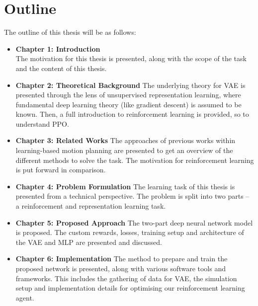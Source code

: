 \section{Outline}

The outline of this thesis will be as follows:
\vspace{2mm}
\begin{itemize}
    \item \textbf{Chapter 1: Introduction} \\
    The motivation for this thesis is presented, along with the scope of the task and the content of this thesis. \vspace{3mm}

    \item \textbf{Chapter 2: Theoretical Background}
    The underlying theory for VAE is presented through the lens of unsupervised representation learning, where fundamental deep learning theory (like gradient descent) is assumed to be known. Then, a full introduction to reinforcement learning is provided, so to understand PPO.
    \vspace{3mm}
    
    \item \textbf{Chapter 3: Related Works} 
    The approaches of previous works within learning-based motion planning are presented to get an overview of the different methods to solve the task. The motivation for reinforcement learning is put forward in comparison.
    \vspace{3mm}
    
    \item \textbf{Chapter 4: Problem Formulation}
    The learning task of this thesis is presented from a technical perspective. The problem is split into two parts -- a reinforcement and representation learning task.
    \vspace{3mm}
    
    \item \textbf{Chapter 5: Proposed Approach}
    The two-part deep neural network model is proposed. The custom rewards, losses, training setup and architecture of the VAE and MLP are presented and discussed.
    \vspace{3mm}
    
    \item \textbf{Chapter 6: Implementation}
    The method to prepare and train the proposed network is presented, along with various software tools and frameworks. This includes the gathering of data for VAE, the simulation setup and implementation details for optimising our reinforcement learning agent.
    \vspace{3mm}
    

\end{itemize}
